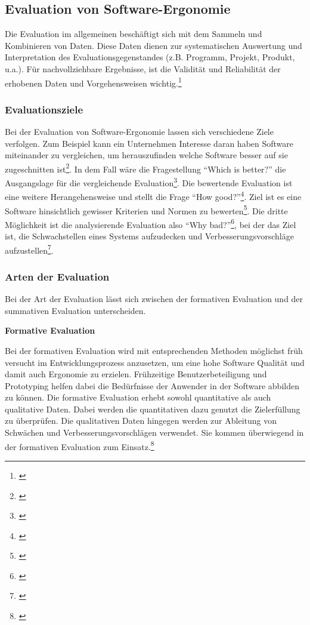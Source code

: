 \subsection{Evaluation von Software-Ergonomie}
Die Evaluation im allgemeinen beschäftigt sich mit dem Sammeln und Kombinieren von Daten. Diese Daten dienen zur systematischen Auswertung und Interpretation des Evaluationsgegenstandes (z.B. Programm, Projekt, Produkt, u.a.). Für nachvollziehbare Ergebnisse, ist die Validität und Reliabilität der erhobenen Daten und Vorgehensweisen wichtig.\footnote{\cite[vgl.][7]{Hegner2003}}


\subsubsection{Evaluationsziele}

Bei der Evaluation von Software-Ergonomie lassen sich verschiedene Ziele verfolgen. Zum Beispiel kann ein Unternehmen Interesse daran haben Software miteinander zu vergleichen, um herauszufinden welche Software besser auf sie zugeschnitten ist\footnote{\cite[vgl.][]{Gediga2002evaluation}}. In dem Fall wäre die Fragestellung \enquote{Which is better?} die Ausgangslage für die vergleichende Evaluation\footnote{\cite[vgl.][9]{Hegner2003}}. Die bewertende Evaluation ist eine weitere Herangehensweise und stellt die Frage \enquote{How good?}\footnote{\cite[vgl.][9]{Hegner2003}}. Ziel ist es eine Software hinsichtlich gewisser Kriterien und Normen zu bewerten\footnote{\cite[vgl.][]{Gediga2002evaluation}}. Die dritte Möglichkeit ist die analysierende Evaluation also \enquote{Why bad?}\footnote{\cite[vgl.][9]{Hegner2003}}, bei der das Ziel ist, die Schwachstellen eines Systems aufzudecken und Verbesserungsvorschläge aufzustellen\footnote{\cite[vgl.][]{Gediga2002evaluation}}.


\subsubsection{Arten der Evaluation}
Bei der Art der Evaluation lässt sich zwischen der formativen Evaluation und der summativen Evaluation unterscheiden.

\textbf{Formative Evaluation}

Bei der formativen Evaluation wird mit entsprechenden Methoden möglichst früh versucht im Entwicklungsprozess anzusetzen, um eine hohe Software Qualität und damit auch Ergonomie zu erzielen. Frühzeitige Benutzerbeteiligung und Prototyping helfen dabei die Bedürfnisse der Anwender in der Software abbilden zu können. Die formative Evaluation erhebt sowohl quantitative als auch qualitative Daten. Dabei werden die quantitativen dazu genutzt die Zielerfüllung zu überprüfen. Die qualitativen Daten hingegen werden zur Ableitung von Schwächen und Verbesserungsvorschlägen verwendet. Sie kommen überwiegend in der formativen Evaluation zum Einsatz.\footnote{\cite[vgl.][7]{Hegner2003}}

